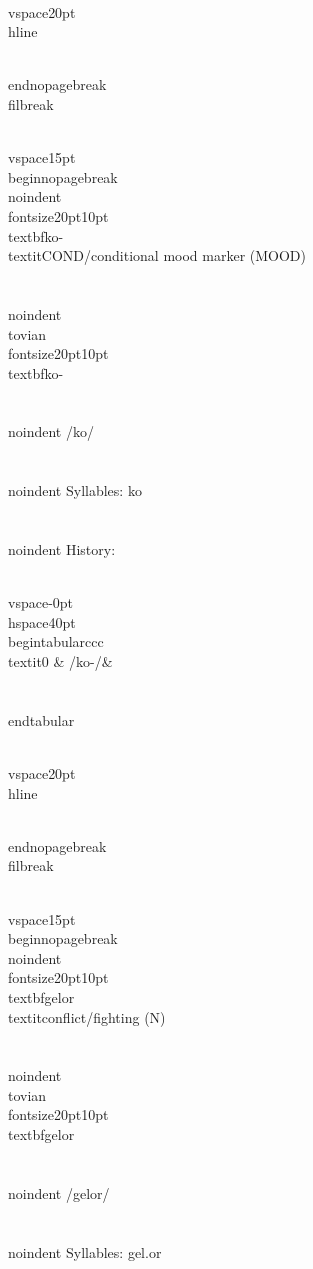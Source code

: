 \\vspace{20pt}\\hline

\\end{nopagebreak}
\\filbreak



\\vspace{15pt}
\\begin{nopagebreak}
\\noindent{\\fontsize{20pt}{10pt}\\textbf{ko-} } \\textit{COND/conditional mood marker} (MOOD)\\\\
\\noindent {\\tovian \\fontsize{20pt}{10pt} \\textbf{ko-} }\\\\
\\noindent /k{\textprimstress}o/\\\\
\\noindent Syllables: ko\\\\


\\noindent History:

\\vspace{-0pt}
\\hspace{40pt}
\\begin{tabular}{ccc}
\\textit{0} & /ko-/& \\\\
\\end{tabular}

\\vspace{20pt}\\hline

\\end{nopagebreak}
\\filbreak



\\vspace{15pt}
\\begin{nopagebreak}
\\noindent{\\fontsize{20pt}{10pt}\\textbf{gelor} } \\textit{conflict/fighting} (N)\\\\
\\noindent {\\tovian \\fontsize{20pt}{10pt} \\textbf{gelor} }\\\\
\\noindent /g{\textprimstress}elor/\\\\
\\noindent Syllables: gel.or\\\\


